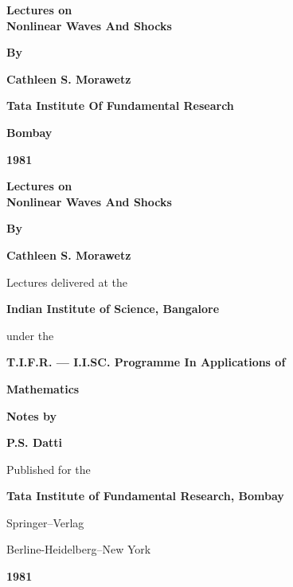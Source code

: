 \thispagestyle{empty}
\begin{center}
{\Large\bfseries Lectures on}\\[5pt]
{\Large\bfseries Nonlinear Waves And Shocks}
\vfill

{\bf By}
\medskip

{\large\bf Cathleen S. Morawetz}
\vfill
 
{\bf Tata Institute  Of Fundamental Research}

{\bf Bombay}

{\bf 1981}
\end{center}

\eject

\thispagestyle{empty}

\begin{center}
{\Large\bfseries Lectures on}\\[5pt]

{\Large\bfseries Nonlinear Waves And Shocks}
\vfill

{\bf By}
\medskip

{\large\bf Cathleen S. Morawetz}
\vfill


Lectures delivered at the 
\medskip

{\bf Indian Institute of Science, Bangalore}
\medskip

under the 
\medskip

{\bf T.I.F.R. --- I.I.SC. Programme In Applications of}
\medskip

{\bf Mathematics}
\vfill

{\bf Notes by}
\medskip

{\large\bf P.S. Datti}
\vfill

Published for the 
\medskip

{\bf Tata Institute  of Fundamental Research, Bombay}
\vfill

Springer--Verlag
\medskip

Berline-Heidelberg--New York
\medskip

{\bf 1981}
\end{center}

\eject

